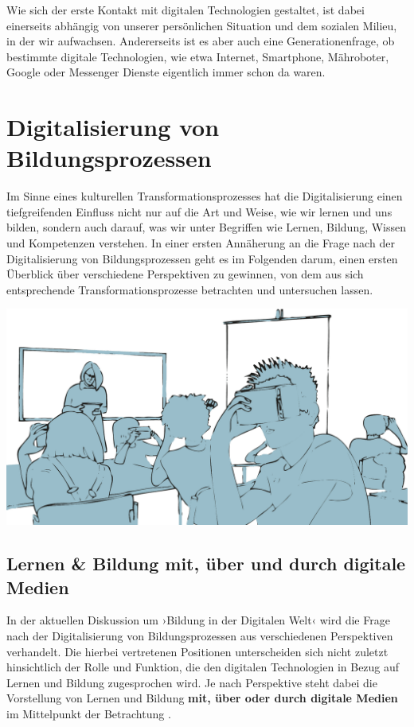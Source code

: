 \documentclass[
  a4paper,
]{book}
\begin{document}
Wie sich der erste Kontakt mit digitalen Technologien gestaltet, ist dabei einerseits abhängig von unserer persönlichen Situation und dem sozialen Milieu, in der wir aufwachsen. Andererseits ist es aber auch eine Generationenfrage, ob bestimmte digitale Technologien, wie etwa Internet, Smartphone, Mähroboter, Google oder Messenger Dienste eigentlich immer schon da waren.

\chapter{Digitalisierung von Bildungsprozessen}\label{digitalisierung-von-bildungsprozessen}

Im Sinne eines kulturellen Transformationsprozesses hat die Digitalisierung einen tiefgreifenden Einfluss nicht nur auf die Art und Weise, wie wir lernen und uns bilden, sondern auch darauf, was wir unter Begriffen wie Lernen, Bildung, Wissen und Kompetenzen verstehen. In einer ersten Annäherung an die Frage nach der Digitalisierung von Bildungsprozessen geht es im Folgenden darum, einen ersten Überblick über verschiedene Perspektiven zu gewinnen, von dem aus sich entsprechende Transformationsprozesse betrachten und untersuchen lassen.

\begin{center}\includegraphics{Figures/03-01-Digitalisierung} \end{center}

\section{Lernen \& Bildung mit, über und durch digitale Medien}\label{lernen-bildung-mit-uxfcber-und-durch-digitale-medien}

In der aktuellen Diskussion um ›Bildung in der Digitalen Welt‹ wird die Frage nach der Digitalisierung von Bildungsprozessen aus verschiedenen Perspektiven verhandelt. Die hierbei vertretenen Positionen unterscheiden sich nicht zuletzt hinsichtlich der Rolle und Funktion, die den digitalen Technologien in Bezug auf Lernen und Bildung zugesprochen wird. Je nach Perspektive steht dabei die Vorstellung von Lernen und Bildung \textbf{mit, über oder durch digitale Medien} im Mittelpunkt der Betrachtung \citep{jorissenMedienbildungSatzen2013, othmerUndNochPaar2016}.
\end{document}
